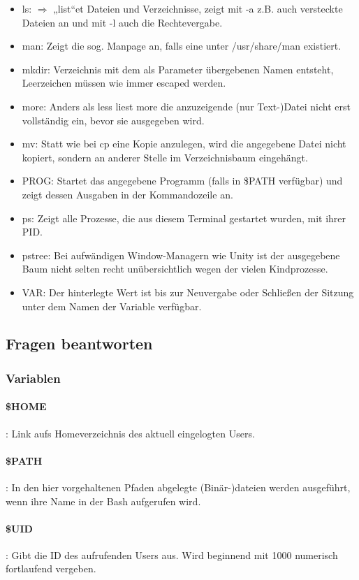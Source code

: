 \documentclass[]{scrartcl}
\begin{document}
\begin{itemize}
	\item ls: $\Rightarrow$ „list“et Dateien und Verzeichnisse, zeigt mit -a z.B. auch versteckte Dateien an und mit -l auch die Rechtevergabe.
	\item man: Zeigt die sog. Manpage an, falls eine unter /usr/share/man existiert.
	\item mkdir: Verzeichnis mit dem als Parameter übergebenen Namen entsteht, Leerzeichen müssen wie immer escaped werden.
	\item more: Anders als less liest more die anzuzeigende (nur Text-)Datei nicht erst vollständig ein, bevor sie ausgegeben wird.
	\item mv: Statt wie bei cp eine Kopie anzulegen, wird die angegebene Datei nicht kopiert, sondern an anderer Stelle im Verzeichnisbaum eingehängt.
	\item PROG: Startet das angegebene Programm (falls in \$PATH verfügbar) und zeigt dessen Ausgaben in der Kommandozeile an.
	\item ps: Zeigt alle Prozesse, die aus diesem Terminal gestartet wurden, mit ihrer PID.
	\item pstree: Bei aufwändigen Window-Managern wie Unity ist der ausgegebene Baum nicht selten recht unübersichtlich wegen der vielen Kindprozesse.
	\item VAR: Der hinterlegte Wert ist bis zur Neuvergabe oder Schließen der Sitzung unter dem Namen der Variable verfügbar.
\end{itemize}

\subsection{Fragen beantworten}
\subsubsection*{Variablen}
\paragraph{\$HOME}: Link aufs Homeverzeichnis des aktuell eingelogten Users.
\paragraph{\$PATH}: In den hier vorgehaltenen Pfaden abgelegte (Binär-)dateien werden ausgeführt, wenn ihre Name in der Bash aufgerufen wird.
\paragraph{\$UID}: Gibt die ID des aufrufenden Users aus. Wird beginnend mit 1000 numerisch fortlaufend vergeben.
\end{document}

